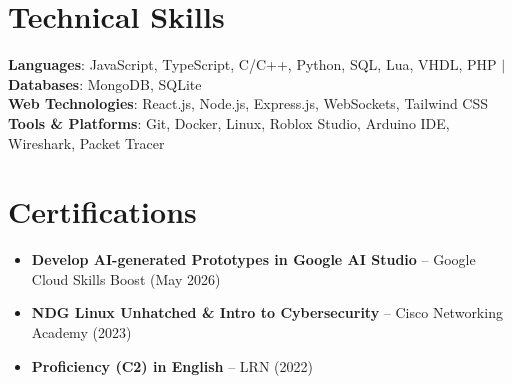 \documentclass[letterpaper,11pt]{article}
\newcommand{\resumeItem}[1]{
  \item\small{
    {#1 \vspace{-2pt}}
  }
}
\newcommand{\resumeSubItem}[1]{\resumeItem{#1}\vspace{-4pt}}
\newcommand{\resumeSubHeadingListStart}{\begin{itemize}[leftmargin=0.15in, label={}]}
\newcommand{\resumeSubHeadingListEnd}{\end{itemize}}
\begin{document}
\section{Technical Skills}
 \begin{itemize}[leftmargin=0.15in, label={}]
    \small{\item{
     \textbf{Languages}{: JavaScript, TypeScript, C/C++, Python, SQL, Lua, VHDL, PHP} $|$
     \textbf{Databases}{: MongoDB, SQLite} \\
     \textbf{Web Technologies}{: React.js, Node.js, Express.js, WebSockets, Tailwind CSS} \\
     \textbf{Tools \& Platforms}{: Git, Docker, Linux, Roblox Studio, Arduino IDE, Wireshark, Packet Tracer}
    }}
 \end{itemize}

\section{Certifications}
  \resumeSubHeadingListStart
    \resumeSubItem{\textbf{Develop AI-generated Prototypes in Google AI Studio} -- Google Cloud Skills Boost (May 2026)}
    \resumeSubItem{\textbf{NDG Linux Unhatched \& Intro to Cybersecurity} -- Cisco Networking Academy (2023)}
    \resumeSubItem{\textbf{Proficiency (C2) in English} -- LRN (2022)}
  \resumeSubHeadingListEnd

\end{document}
